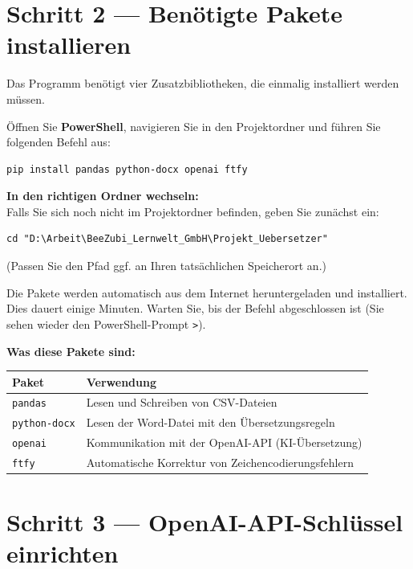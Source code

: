 \documentclass[a4paper,11pt]{article}
\newenvironment{hinweisbox}{%
  \begin{mdframed}[backgroundcolor=hinweis,linecolor=hinweisrand,linewidth=1pt,
    innerleftmargin=8pt,innerrightmargin=8pt,innertopmargin=6pt,innerbottommargin=6pt]
  \small}{%
  \end{mdframed}}
\begin{document}
\section{Schritt 2 — Benötigte Pakete installieren}

Das Programm benötigt vier Zusatzbibliotheken, die einmalig installiert werden müssen.

Öffnen Sie \textbf{PowerShell}, navigieren Sie in den Projektordner und führen Sie
folgenden Befehl aus:

\begin{lstlisting}
pip install pandas python-docx openai ftfy
\end{lstlisting}

\begin{hinweisbox}
\textbf{In den richtigen Ordner wechseln:}\\
Falls Sie sich noch nicht im Projektordner befinden, geben Sie zunächst ein:
\begin{lstlisting}
cd "D:\Arbeit\BeeZubi_Lernwelt_GmbH\Projekt_Uebersetzer"
\end{lstlisting}
(Passen Sie den Pfad ggf. an Ihren tatsächlichen Speicherort an.)
\end{hinweisbox}

Die Pakete werden automatisch aus dem Internet heruntergeladen und installiert.
Dies dauert einige Minuten. Warten Sie, bis der Befehl abgeschlossen ist
(Sie sehen wieder den PowerShell-Prompt \texttt{>}).

\textbf{Was diese Pakete sind:}
\begin{center}
\begin{tabularx}{0.92\textwidth}{@{}l X@{}}
\toprule
\textbf{Paket} & \textbf{Verwendung} \\
\midrule
\texttt{pandas} & Lesen und Schreiben von CSV-Dateien \\[3pt]
\texttt{python-docx} & Lesen der Word-Datei mit den Übersetzungsregeln \\[3pt]
\texttt{openai} & Kommunikation mit der OpenAI-API (KI-Übersetzung) \\[3pt]
\texttt{ftfy} & Automatische Korrektur von Zeichencodierungsfehlern \\
\bottomrule
\end{tabularx}
\end{center}

\section{Schritt 3 — OpenAI-API-Schlüssel einrichten}
\end{document}
